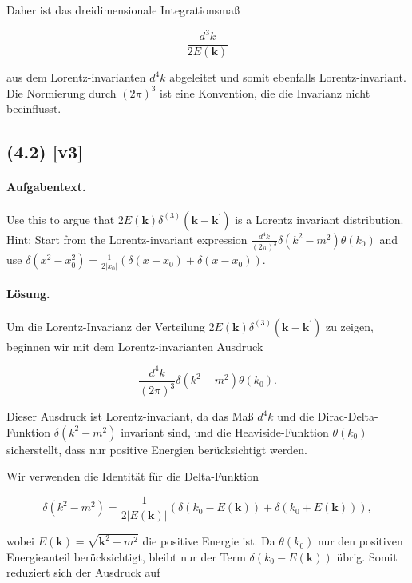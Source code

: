 \documentclass[11pt,a4paper]{article}
\begin{document}
Daher ist das dreidimensionale Integrationsmaß

\[
\frac{d^3 k}{2 E(\mathbf{k})}
\]

aus dem Lorentz-invarianten \(d^4 k\) abgeleitet und somit ebenfalls Lorentz-invariant. Die Normierung durch \((2 \pi)^3\) ist eine Konvention, die die Invarianz nicht beeinflusst.


\subsection*{(4.2) [v3]}
\paragraph{Aufgabentext.}
Use this to argue that $2 E(\mathbf{k}) \delta^{(3)}\left(\mathbf{k}-\mathbf{k}^{\prime}\right)$ is a Lorentz invariant distribution.
Hint: Start from the Lorentz-invariant expression $\frac{d^4 k}{(2 \pi)^3} \delta\left(k^2-m^2\right) \theta\left(k_0\right)$ and use $\delta\left(x^2-x_0^2\right)=\frac{1}{2\left|x_0\right|}\left(\delta\left(x+x_0\right)+\delta\left(x-x_0\right)\right)$.

\paragraph{Lösung.}
Um die Lorentz-Invarianz der Verteilung \(2 E(\mathbf{k}) \delta^{(3)}\left(\mathbf{k}-\mathbf{k}^{\prime}\right)\) zu zeigen, beginnen wir mit dem Lorentz-invarianten Ausdruck

\[
\frac{d^4 k}{(2 \pi)^3} \delta\left(k^2-m^2\right) \theta\left(k_0\right).
\]

Dieser Ausdruck ist Lorentz-invariant, da das Maß \(d^4 k\) und die Dirac-Delta-Funktion \(\delta\left(k^2-m^2\right)\) invariant sind, und die Heaviside-Funktion \(\theta\left(k_0\right)\) sicherstellt, dass nur positive Energien berücksichtigt werden.

Wir verwenden die Identität für die Delta-Funktion

\[
\delta\left(k^2-m^2\right) = \frac{1}{2|E(\mathbf{k})|} \left( \delta\left(k_0 - E(\mathbf{k})\right) + \delta\left(k_0 + E(\mathbf{k})\right) \right),
\]

wobei \(E(\mathbf{k}) = \sqrt{\mathbf{k}^2 + m^2}\) die positive Energie ist. Da \(\theta(k_0)\) nur den positiven Energieanteil berücksichtigt, bleibt nur der Term \(\delta\left(k_0 - E(\mathbf{k})\right)\) übrig. Somit reduziert sich der Ausdruck auf
\end{document}
